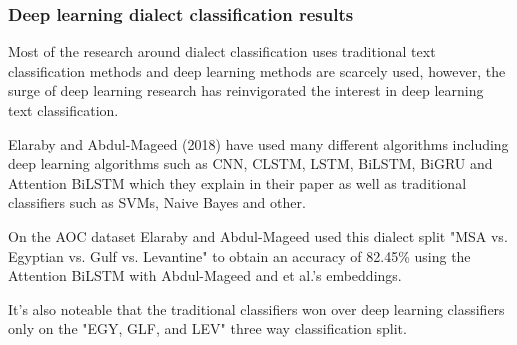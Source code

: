 \documentclass[12pt]{diazessay}
\begin{document}
        
        \subsubsection{Deep learning dialect classification results}
        Most of the research around dialect classification uses traditional text classification methods and deep learning methods are scarcely used, however, the surge of deep learning research has reinvigorated the interest in deep learning text classification.
        
        Elaraby and Abdul-Mageed (2018) have used many different algorithms including deep learning algorithms such as CNN, CLSTM, LSTM, BiLSTM, BiGRU and Attention BiLSTM which they explain in their paper\cite{elaraby-abdul-mageed-2018-deep} as well as traditional classifiers such as SVMs, Naive Bayes and other.
        
        On the AOC dataset Elaraby and Abdul-Mageed used this dialect split "MSA vs. Egyptian vs. Gulf vs. Levantine" to obtain an accuracy of 82.45\% using the Attention BiLSTM with Abdul-Mageed and et al.'s embeddings\cite{elaraby-abdul-mageed-2018-deep}.
        
        It's also noteable that the traditional classifiers won over deep learning classifiers only on the "EGY, GLF, and LEV" three way classification split\cite{elaraby-abdul-mageed-2018-deep}.
        

\end{document}
